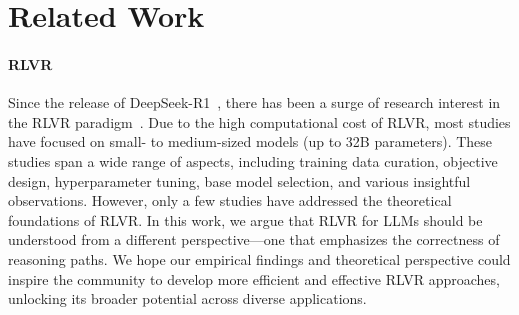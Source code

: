 \section{Related Work}
\label{sec:rel_work}


\paragraph{RLVR}
Since the release of DeepSeek-R1~\citep{guo2025deepseek-r1}, there has been a surge of research interest in the RLVR paradigm~\citep{deepscaler2025,liu2025DrGRPO-Oat-Zero,hu2025OpenReasonerZero,cui2025PRIME,xie2025LogicRL,zeng2025SimpleRL-Zoo-Zero,yu2025DAPO-Zero,deepcoder2025,chen2025NFT,he2025Skywork-OR1,wen2025Light-R1,cao2025skyrl,liu2025ProRL,chen2025AceReason-Nemotron}.
Due to the high computational cost of RLVR, most studies have focused on small- to medium-sized models (up to 32B parameters).
These studies span a wide range of aspects, including training data curation, objective design, hyperparameter tuning, base model selection, and various insightful observations.
However, only a few studies have addressed the theoretical foundations of RLVR.
In this work, we argue that RLVR for LLMs should be understood from a different perspective—one that emphasizes the correctness of reasoning paths.
We hope our empirical findings and theoretical perspective could inspire the community to develop more efficient and effective RLVR approaches, unlocking its broader potential across diverse applications.

